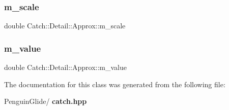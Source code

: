 \mbox{\label{class_catch_1_1_detail_1_1_approx_a65e9bdab9113ff3300b45f0a4e048dd7}} 
\subsubsection{m\_scale}
{\footnotesize\ttfamily double Catch\+::\+Detail\+::\+Approx\+::m\+\_\+scale\hspace{0.3cm}{\ttfamily [private]}}

\mbox{\label{class_catch_1_1_detail_1_1_approx_af7aeef703bd591f5ec85407b1dac053c}} 
\subsubsection{m\_value}
{\footnotesize\ttfamily double Catch\+::\+Detail\+::\+Approx\+::m\+\_\+value\hspace{0.3cm}{\ttfamily [private]}}



The documentation for this class was generated from the following file\+:\begin{DoxyCompactItemize}
\item 
Penguin\+Glide/\textbf{ catch.\+hpp}\end{DoxyCompactItemize}
